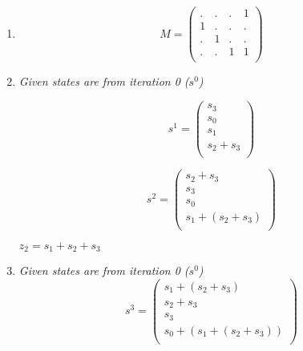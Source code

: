 \documentclass[12pt,a4paper,final,onecolumn,oneside]{article}
\begin{document}
\section{}
\begin{enumerate}[label=(\alph*)]
    \item
    \begin{equation*}
    M = 
    \begin{pmatrix}
    . & . & . & 1 \\
    1 & . & . & . \\
    . & 1 & . & . \\
    . & . & 1 & 1 \\
    \end{pmatrix}
    \end{equation*}
    \item
    \emph{Given states are from iteration 0 ($s^0$)}
    
    \begin{equation*}
    s^1 = 
    \begin{pmatrix}
    s_3 \\
    s_0 \\
    s_1  \\
    s_2 + s_3 \\
    \end{pmatrix}
    \end{equation*}
    
    \begin{equation*}
    s^2 = 
    \begin{pmatrix}
    s_2 + s_3 \\
    s_3 \\
    s_0 \\
    s_1 + (s_2 + s_3) \\
    \end{pmatrix}
    \end{equation*}
    
    $z_2 = s_1 + s_2 + s_3$
    \item
    \emph{Given states are from iteration 0 ($s^0$)}
    \begin{equation*}
    s^3 = 
    \begin{pmatrix}
    s_1 + (s_2 + s_3) \\
    s_2 + s_3 \\
    s_3 \\
    s_0 + (s_1 + (s_2 + s_3)) \\
    \end{pmatrix}
    \end{equation*}
    

\end{enumerate}
\end{document}
